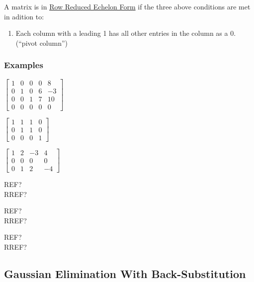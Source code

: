 \documentclass[
  letterpaper,
  DIV=11,
  numbers=noendperiod]{scrartcl}
\providecommand{\tightlist}{%
  \setlength{\itemsep}{0pt}\setlength{\parskip}{0pt}}\usepackage{longtable,booktabs,array}
\begin{document}
A matrix is in \ul{Row Reduced Echelon Form} if the three above
conditions are met in adition to:

\begin{enumerate}
\def\labelenumi{(\alph{enumi})}
\setcounter{enumi}{3}
\tightlist
\item
  Each column with a leading 1 has all other entries in the column as a
  0. (``pivot column'')
\end{enumerate}

\newpage{}

\subsubsection{Examples}\label{examples-1}

\begin{multicols}{2}
$\begin{bmatrix}1 & 0 & 0 & 0 & 8\\ 0 & 1 & 0 & 6 & -3 \\ 0 & 0 & 1 & 7 & 10\\ 0 & 0 & 0 & 0 & 0 \end{bmatrix}$

$\begin{bmatrix}1 & 1 & 1 & 0 \\ 0 & 1 & 1 & 0 \\ 0 & 0 & 0 & 1 \end{bmatrix}$

$\begin{bmatrix}1 & 2 & -3 & 4 \\ 0 & 0 & 0 & 0 \\ 0 & 1 & 2 & -4\end{bmatrix}$
\columnbreak

REF? \checkmark \\
RREF? \checkmark \\

\vspace{1cm}

REF? \checkmark \\
RREF? \times \\

\vspace{1cm}

REF? \times \\
RREF? \times

\end{multicols}

\subsection{\texorpdfstring{Gaussian Elimination With
\textbf{Back-Substitution}}{Gaussian Elimination With Back-Substitution}}\label{gaussian-elimination-with-back-substitution}
\end{document}
